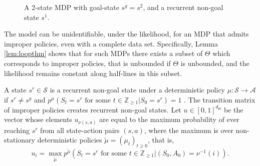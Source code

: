 \documentclass{amsart}
\begin{document}
\begin{figure}[ht!]
\captionsetup{justification=raggedright}  
\centering
{}
\EndAccSupp{}
    \caption{A 2-state MDP with goal-state $s^g=s^2$, and a recurrent non-goal state $s^1$.}
    \label{fig:2dmdp}
\end{figure}
The model can be unidentifiable, under the likelihood, for an MDP that admits improper policies, even with a complete data set. Specifically, Lemma \ref{lem:loopthm} shows that for such MDPs there exists a subset of $\Theta$ which corresponds to improper policies, that is unbounded if $\Theta$ is unbounded, and the likelihood remains constant along half-lines in this subset.

A state $s^r \in \mathcal{S}$ is a recurrent non-goal state under a deterministic policy $\mu:\mathcal{S} \rightarrow \mathcal{A}$ if $s^r \neq s^g$ and $p^\mu(S_t=s^r \text{ for some } t \in \mathbb{Z}_{\geq 1}|S_0=s^r)=1$ . The transition matrix of improper policies creates recurrent non-goal states. Let $u \in [0,1]^{d_\Theta}$ be the vector whose elements $u_{\nu(s,a)}$ are equal to the maximum probability of ever reaching $s^r$ from all state-action pairs $(s,a)$, where the maximum is over non-stationary deterministic policies $\tilde{\mu}=( \mu_t )_{t\geq 0}$, that is,  
\begin{equation}\label{eqn:maxprob_u}
u_i=\max_{\tilde{\mu}} p^{\tilde{\mu}}(S_t=s^r \text{ for some } t \in \mathbb{Z}_{\geq 1}|(S_0,A_0) = \nu^{-1}(i)).
\end{equation}
\end{document}

